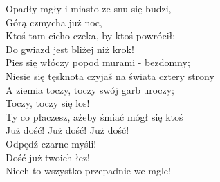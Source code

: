 
\begin{flushleft}
Opadły mgły i miasto ze snu się budzi, \\
Górą czmycha już noc, \tab{} \\
Ktoś tam cicho czeka, by ktoś powrócił; \\
Do gwiazd jest bliżej niż krok! \\
Pies się włóczy popod murami - bezdomny; \\
Niesie się tęsknota czyjaś na świata cztery strony \\
\vskip 3mm
\hspace{0.9cm}A ziemia toczy, toczy swój garb uroczy; \\
\hspace{0.9cm}Toczy, toczy się los! \\
\hspace{0.9cm}Ty co płaczesz, ażeby śmiać mógł się ktoś \\
\hspace{0.9cm}Już dość! Już dość! Już dość! \\
\hspace{0.9cm}Odpędź czarne myśli! \\
\hspace{0.9cm}Dość już twoich łez! \\
\hspace{0.9cm}Niech to wszystko przepadnie we mgle! 


\end{flushleft}
